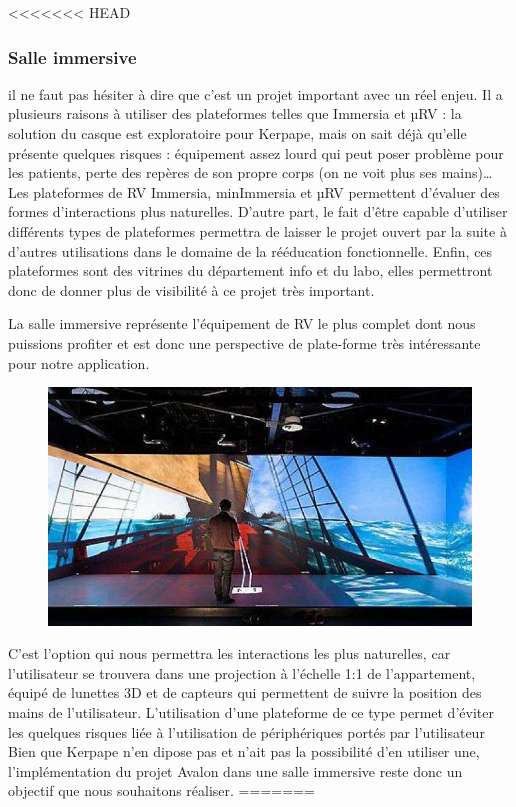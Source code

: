 <<<<<<< HEAD
\subsubsection{Salle immersive}

il ne faut pas hésiter à dire que c’est un projet important avec un réel enjeu.
Il a plusieurs raisons à utiliser des plateformes telles que Immersia et µRV : la solution du casque est exploratoire pour Kerpape,
mais on sait déjà qu’elle présente quelques risques  : équipement assez lourd qui peut poser problème pour les patients, perte des repères de son propre corps (on ne voit plus ses mains)… 
Les plateformes de RV Immersia, minImmersia et µRV permettent d’évaluer des formes d’interactions plus naturelles. 
D’autre part, le fait d’être capable d’utiliser différents types de plateformes permettra de laisser le projet ouvert par la suite à d’autres utilisations dans le domaine de la rééducation fonctionnelle. 
Enfin, ces plateformes sont des vitrines du département info et du labo, elles permettront donc de donner plus de visibilité à ce projet très important.


La salle immersive représente l'équipement de RV le plus complet dont nous puissions profiter et est donc une perspective de plate-forme très intéressante pour notre application.
\begin{figure}
	\centering
	\includegraphics[scale=0.5]{2-Specifications/img-utilisateur/immersia.jpg}
\end{figure}
C'est l'option qui nous permettra les interactions les plus naturelles, car l'utilisateur se trouvera dans une projection à l'échelle 1:1 de l'appartement, équipé de lunettes 3D et de capteurs qui permettent de suivre la position des mains de l'utilisateur. \newline
L'utilisation d'une plateforme de ce type permet d'éviter les quelques risques liée à l'utilisation de périphériques portés par l'utilisateur
Bien que Kerpape n'en dipose pas et n'ait pas la possibilité d'en utiliser une, l'implémentation du projet Avalon dans une salle immersive reste donc un objectif que nous souhaitons réaliser.
=======

